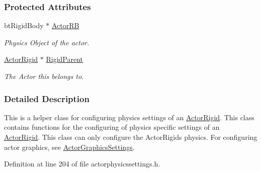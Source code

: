 \subsubsection*{Protected Attributes}
\begin{DoxyCompactItemize}
\item 
\hypertarget{classphys_1_1ActorRigidPhysicsSettings_af92d6c9108279828425390b02612861f}{
btRigidBody $\ast$ \hyperlink{classphys_1_1ActorRigidPhysicsSettings_af92d6c9108279828425390b02612861f}{ActorRB}}
\label{classphys_1_1ActorRigidPhysicsSettings_af92d6c9108279828425390b02612861f}

\begin{DoxyCompactList}\small\item\em Physics Object of the actor. \item\end{DoxyCompactList}\item 
\hypertarget{classphys_1_1ActorRigidPhysicsSettings_a8fe8b3e8632c9ae82fdd091f9628690b}{
\hyperlink{classphys_1_1ActorRigid}{ActorRigid} $\ast$ \hyperlink{classphys_1_1ActorRigidPhysicsSettings_a8fe8b3e8632c9ae82fdd091f9628690b}{RigidParent}}
\label{classphys_1_1ActorRigidPhysicsSettings_a8fe8b3e8632c9ae82fdd091f9628690b}

\begin{DoxyCompactList}\small\item\em The Actor this belongs to. \item\end{DoxyCompactList}\end{DoxyCompactItemize}


\subsubsection{Detailed Description}
This is a helper class for configuring physics settings of an \hyperlink{classphys_1_1ActorRigid}{ActorRigid}. This class contains functions for the configuring of physics specific settings of an \hyperlink{classphys_1_1ActorRigid}{ActorRigid}. This class can only configure the ActorRigids physics. For configuring actor graphics, see \hyperlink{classphys_1_1ActorGraphicsSettings}{ActorGraphicsSettings}. 

Definition at line 204 of file actorphysicssettings.h.



